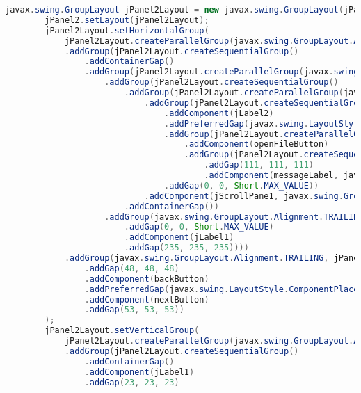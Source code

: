 \begin{lstlisting}[language=Java, caption=TampilanDataWirausaha.java]
        javax.swing.GroupLayout jPanel2Layout = new javax.swing.GroupLayout(jPanel2);
        jPanel2.setLayout(jPanel2Layout);
        jPanel2Layout.setHorizontalGroup(
            jPanel2Layout.createParallelGroup(javax.swing.GroupLayout.Alignment.LEADING)
            .addGroup(jPanel2Layout.createSequentialGroup()
                .addContainerGap()
                .addGroup(jPanel2Layout.createParallelGroup(javax.swing.GroupLayout.Alignment.LEADING)
                    .addGroup(jPanel2Layout.createSequentialGroup()
                        .addGroup(jPanel2Layout.createParallelGroup(javax.swing.GroupLayout.Alignment.LEADING)
                            .addGroup(jPanel2Layout.createSequentialGroup()
                                .addComponent(jLabel2)
                                .addPreferredGap(javax.swing.LayoutStyle.ComponentPlacement.UNRELATED)
                                .addGroup(jPanel2Layout.createParallelGroup(javax.swing.GroupLayout.Alignment.LEADING)
                                    .addComponent(openFileButton)
                                    .addGroup(jPanel2Layout.createSequentialGroup()
                                        .addGap(111, 111, 111)
                                        .addComponent(messageLabel, javax.swing.GroupLayout.PREFERRED_SIZE, 122, javax.swing.GroupLayout.PREFERRED_SIZE)))
                                .addGap(0, 0, Short.MAX_VALUE))
                            .addComponent(jScrollPane1, javax.swing.GroupLayout.Alignment.TRAILING, javax.swing.GroupLayout.DEFAULT_SIZE, 579, Short.MAX_VALUE))
                        .addContainerGap())
                    .addGroup(javax.swing.GroupLayout.Alignment.TRAILING, jPanel2Layout.createSequentialGroup()
                        .addGap(0, 0, Short.MAX_VALUE)
                        .addComponent(jLabel1)
                        .addGap(235, 235, 235))))
            .addGroup(javax.swing.GroupLayout.Alignment.TRAILING, jPanel2Layout.createSequentialGroup()
                .addGap(48, 48, 48)
                .addComponent(backButton)
                .addPreferredGap(javax.swing.LayoutStyle.ComponentPlacement.RELATED, javax.swing.GroupLayout.DEFAULT_SIZE, Short.MAX_VALUE)
                .addComponent(nextButton)
                .addGap(53, 53, 53))
        );
        jPanel2Layout.setVerticalGroup(
            jPanel2Layout.createParallelGroup(javax.swing.GroupLayout.Alignment.LEADING)
            .addGroup(jPanel2Layout.createSequentialGroup()
                .addContainerGap()
                .addComponent(jLabel1)
                .addGap(23, 23, 23)

\end{lstlisting}
